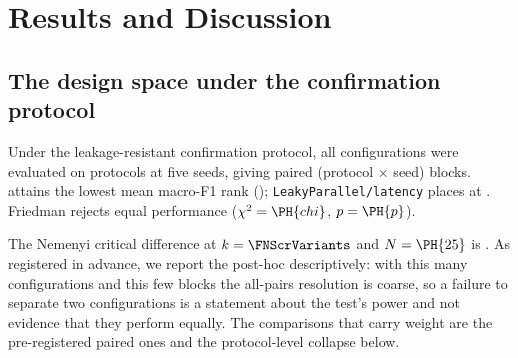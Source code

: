 %
%
%
%

\section{Results and Discussion}

\subsection{The design space under the confirmation protocol}
\label{sec:res-conf}

Under the leakage-resistant confirmation protocol, all \FNScrVariants{}
configurations were evaluated on  protocols at five seeds, giving
 paired (protocol $\times$ seed) blocks.  attains the lowest
mean macro-F1 rank (); \texttt{LeakyParallel/latency} places
 at . Friedman rejects equal performance
($\chi^2=\PH{chi}$, $p=\PH{p}$).

The Nemenyi critical difference at $k=\FNScrVariants$ and $N=\PH{25}$ is
. As registered in advance, we report the post-hoc descriptively: with
this many configurations and this few blocks the all-pairs resolution is coarse,
so a failure to separate two configurations is a statement about the test's
power and not evidence that they perform equally. The comparisons that carry
weight are the pre-registered paired ones and the protocol-level collapse below.

